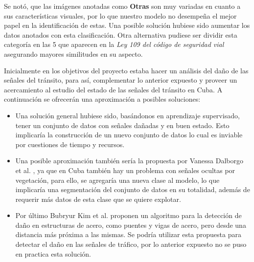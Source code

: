 \documentclass{article}
\begin{document}
Se notó, que las imágenes anotadas como \textbf{Otras} son muy variadas en cuanto a sus características visuales, por lo que nuestro modelo no desempeña el mejor papel en la identificación de estas. Una posible solución hubiese sido aumentar los datos anotados con esta clasificación. Otra alternativa pudiese ser dividir esta categoría en las 5 que aparecen en la \textit{Ley 109 del código de seguridad vial}\cite{ref7} asegurando mayores similitudes en su aspecto.

Inicialmente en los objetivos del proyecto estaba hacer un análisis del daño de las señales del tránsito, para así, complementar lo anterior expuesto y proveer un acercamiento al estudio del estado de las señales del tránsito en Cuba. A continuación se ofrecerán una aproximación a posibles soluciones:
\begin{itemize}
 \item{Una solución general hubiese sido, basándonos en aprendizaje supervisado, tener un conjunto de datos con señales dañadas y en buen estado. Esto implicaría la construcción de un nuevo conjunto de datos lo cual es inviable por cuestiones de tiempo y recursos.}
 \item{Una posible aproximación también sería la propuesta por Vanessa Dalborgo et al. \cite{ref11}, ya que en Cuba también hay un problema con señales ocultas por vegetación, para ello, se agregaría una nueva clase al modelo, lo que implicaría una segmentación del conjunto de datos en su totalidad, además de requerir más datos de esta clase que se quiere explotar.}
\item{Por último Bubryur Kim et al. \cite{ref4} proponen un algoritmo para la detección de daño en estructuras de acero, como puentes  y vigas de acero, pero desde una distancia más próxima a las mismas. Se podría utilizar esta propuesta para detectar el daño en las señales de tráfico, por lo anterior expuesto no se puso en practica esta solución.}
\end{itemize}

\end{document}
